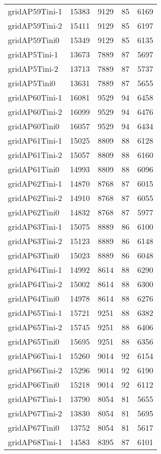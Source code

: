 \documentclass[../../../thesis.tex]{subfiles}
\begin{document}
\begin{longtable}{lrrrr}
gridAP59Tini-1 & 15383 & 9129 & 85 & 6169 \\
gridAP59Tini-2 & 15411 & 9129 & 85 & 6197 \\
gridAP59Tini0 & 15349 & 9129 & 85 & 6135 \\
gridAP5Tini-1 & 13673 & 7889 & 87 & 5697 \\
gridAP5Tini-2 & 13713 & 7889 & 87 & 5737 \\
gridAP5Tini0 & 13631 & 7889 & 87 & 5655 \\
gridAP60Tini-1 & 16081 & 9529 & 94 & 6458 \\
gridAP60Tini-2 & 16099 & 9529 & 94 & 6476 \\
gridAP60Tini0 & 16057 & 9529 & 94 & 6434 \\
gridAP61Tini-1 & 15025 & 8809 & 88 & 6128 \\
gridAP61Tini-2 & 15057 & 8809 & 88 & 6160 \\
gridAP61Tini0 & 14993 & 8809 & 88 & 6096 \\
gridAP62Tini-1 & 14870 & 8768 & 87 & 6015 \\
gridAP62Tini-2 & 14910 & 8768 & 87 & 6055 \\
gridAP62Tini0 & 14832 & 8768 & 87 & 5977 \\
gridAP63Tini-1 & 15075 & 8889 & 86 & 6100 \\
gridAP63Tini-2 & 15123 & 8889 & 86 & 6148 \\
gridAP63Tini0 & 15023 & 8889 & 86 & 6048 \\
gridAP64Tini-1 & 14992 & 8614 & 88 & 6290 \\
gridAP64Tini-2 & 15002 & 8614 & 88 & 6300 \\
gridAP64Tini0 & 14978 & 8614 & 88 & 6276 \\
gridAP65Tini-1 & 15721 & 9251 & 88 & 6382 \\
gridAP65Tini-2 & 15745 & 9251 & 88 & 6406 \\
gridAP65Tini0 & 15695 & 9251 & 88 & 6356 \\
gridAP66Tini-1 & 15260 & 9014 & 92 & 6154 \\
gridAP66Tini-2 & 15296 & 9014 & 92 & 6190 \\
gridAP66Tini0 & 15218 & 9014 & 92 & 6112 \\
gridAP67Tini-1 & 13790 & 8054 & 81 & 5655 \\
gridAP67Tini-2 & 13830 & 8054 & 81 & 5695 \\
gridAP67Tini0 & 13752 & 8054 & 81 & 5617 \\
gridAP68Tini-1 & 14583 & 8395 & 87 & 6101 \\

\end{longtable}
\end{document}
